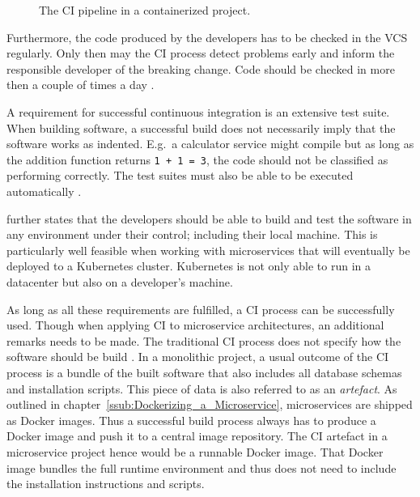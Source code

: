 \begin{figure}[H]
\begin{center}
\end{center}
\caption{The \ac{CI} pipeline in a containerized project.}%
\label{fig:containerCIWorkflow}
\end{figure}


Furthermore, the code produced by the developers has to be checked in the
\ac{VCS} regularly. Only then may the \ac{CI} process detect problems early and
inform the responsible developer of the breaking change. Code should be checked
in more then a couple of times a day \autocite[p.
59]{JezHumbleContinuousDelivery2010}.

A requirement for successful continuous integration is an extensive test suite.
When building software, a successful build does not necessarily imply that the
software works as indented. E.g.\ a calculator service might compile but as
long as the addition function returns \texttt{1 + 1 = 3}, the code should not be
classified as performing correctly. The test suites must also be able to be
executed automatically \autocite[p. 60]{JezHumbleContinuousDelivery2010}.

\autocite[p. 62]{JezHumbleContinuousDelivery2010} further states that the
developers should be able to build and test the software in any environment
under their control; including their local machine. This is particularly well
feasible when working with microservices that will eventually be deployed to a
Kubernetes cluster. Kubernetes is not only able to run in a datacenter but also
on a developer's machine.

As long as all these requirements are fulfilled, a \ac{CI} process can be
successfully used. Though when applying \ac{CI} to microservice architectures,
an additional remarks needs to be made. The traditional \ac{CI} process does
not specify how the software should be build \autocite[p.
18]{MatyasContinuousIntegration2007}. In a monolithic project, a usual outcome
of the \ac{CI} process is a bundle of the built software that also includes all
database schemas and installation scripts. This piece of data is also referred
to as an \textit{artefact}. As outlined in
chapter~\ref{ssub:Dockerizing_a_Microservice}, microservices are shipped as
Docker images. Thus a successful build process always has to produce a Docker
image and push it to a central image repository. The \ac{CI} artefact in a
microservice project hence would be a runnable Docker image. That Docker image
bundles the full runtime environment and thus does not need to include the
installation instructions and scripts.


